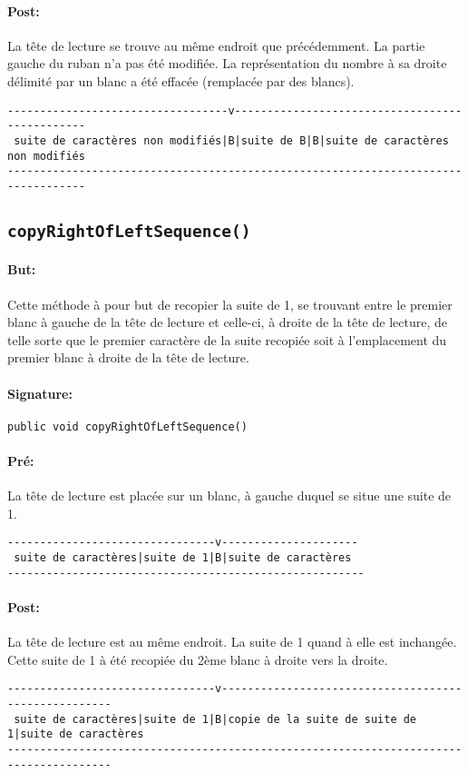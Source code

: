 \documentclass[a4paper,11pt]{article}
\begin{document}
\paragraph{Post:} 
La tête de lecture se trouve au même endroit que précédemment. La partie gauche du ruban n'a pas été modifiée. La représentation du nombre à sa droite délimité par un blanc a été effacée (remplacée par des blancs).
\begin{small}
\begin{verbatim}
----------------------------------v-----------------------------------------------
 suite de caractères non modifiés|B|suite de B|B|suite de caractères non modifiés
----------------------------------------------------------------------------------
\end{verbatim}
\end{small}
\subsection{\texttt{copyRightOfLeftSequence()}}
\paragraph{But:} Cette méthode à pour but de recopier la suite de 1, se trouvant entre le premier blanc à gauche de la tête de lecture et celle-ci, à droite de la tête de lecture, de telle sorte que le premier caractère de la suite recopiée soit à l'emplacement du premier blanc à droite de la tête de lecture.
\paragraph{Signature:} \texttt{public void copyRightOfLeftSequence()}
\paragraph{Pré:} La tête de lecture est placée sur un blanc, à gauche duquel se situe une suite de 1.
\begin{verbatim}
--------------------------------v---------------------
 suite de caractères|suite de 1|B|suite de caractères
-------------------------------------------------------
\end{verbatim}
\paragraph{Post:} La tête de lecture est au même endroit. La suite de 1 quand à elle est inchangée. Cette suite de 1 à été recopiée du 2ème blanc à droite vers la droite.
\begin{small}
\begin{verbatim}
--------------------------------v-----------------------------------------------------
 suite de caractères|suite de 1|B|copie de la suite de suite de 1|suite de caractères
--------------------------------------------------------------------------------------
\end{verbatim}
\end{small}
\end{document}
